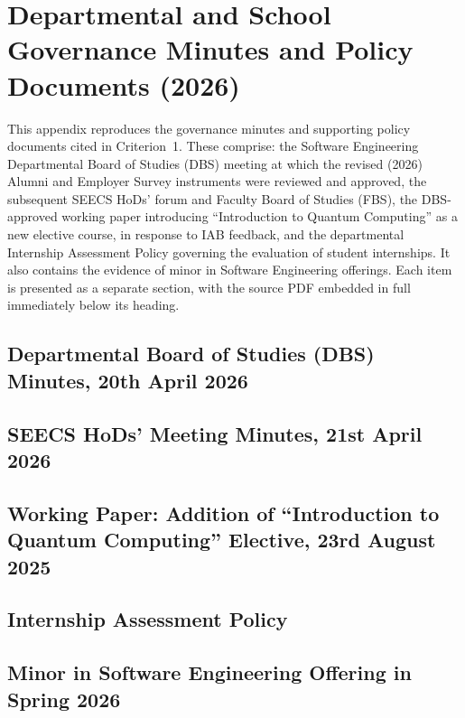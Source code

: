 \chapter{Departmental and School Governance Minutes and Policy Documents (2026)}\label{app:governance_minutes}

This appendix reproduces the governance minutes and supporting policy documents cited in Criterion~1. These comprise: the Software Engineering Departmental Board of Studies (DBS) meeting at which the revised (2026) Alumni and Employer Survey instruments were reviewed and approved, the subsequent SEECS HoDs' forum and Faculty Board of Studies (FBS), the DBS-approved working paper introducing ``Introduction to Quantum Computing'' as a new elective course, in response to IAB feedback, and the departmental Internship Assessment Policy governing the evaluation of student internships. It also contains the evidence of minor in Software Engineering offerings. Each item is presented as a separate section, with the source PDF embedded in full immediately below its heading.

\section{Departmental Board of Studies (DBS) Minutes, 20th April 2026}

\section{SEECS HoDs' Meeting Minutes, 21st April 2026}

\section{Working Paper: Addition of ``Introduction to Quantum Computing'' Elective, 23rd August 2025}

\section{Internship Assessment Policy}

\section{Minor in Software Engineering Offering in Spring 2026}

